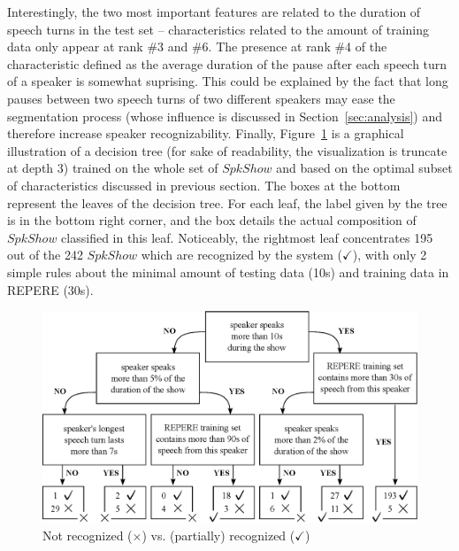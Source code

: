 Interestingly, the two most important features are related to the duration of speech turns in the test set -- characteristics related to the amount of training data only appear at rank \#3 and \#6. 
The presence at rank \#4 of the characteristic defined as the average duration of the pause after each speech turn of a speaker is somewhat suprising. This could be explained by the fact that long pauses between two speech turns of two different speakers may ease the segmentation process (whose influence is discussed in Section~\ref{sec:analysis}) and therefore increase speaker recognizability.
Finally, Figure~\ref{fig:tree} is a graphical illustration of a decision tree (for sake of readability, the visualization is truncate at depth 3) trained on the whole set of $SpkShow$ and based on the optimal subset of characteristics discussed in previous section. The boxes at the bottom represent the leaves of the decision tree. For each leaf, the label given by the tree is in the bottom right corner, and the box details the actual composition of $SpkShow$ classified in this leaf.
Noticeably, the rightmost leaf concentrates 195 out of the 242  $SpkShow$ which are recognized by the system ($\checkmark$), with only 2 simple rules about the minimal amount of testing data (10s) and training data in REPERE (30s).
\begin{figure}[t]
\centering
\includegraphics[width=\linewidth]{figures/tree.eps}
\caption{Not recognized ($\times$) vs. (partially) recognized ($\checkmark$)}
\label{fig:tree}
\end{figure}



